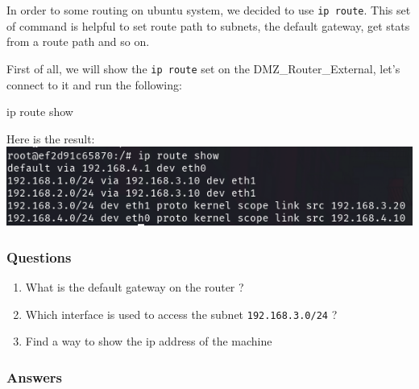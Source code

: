 \documentclass[a4paper,11pt,singlespacing]{article}
\newenvironment{Shaded}{}{}
\newcommand{\ExtensionTok}[1]{#1}
\newcommand{\NormalTok}[1]{#1}
\providecommand{\tightlist}{%
  \setlength{\itemsep}{0pt}\setlength{\parskip}{0pt}}
\begin{document}
In order to some routing on ubuntu system, we decided to use
\texttt{ip\ route}. This set of command is helpful to set route path to
subnets, the default gateway, get stats from a route path and so on.

First of all, we will show the \texttt{ip\ route} set on the
DMZ\_Router\_External, let's connect to it and run the following:

\begin{Shaded}
\begin{Highlighting}[]
\ExtensionTok{ip}\NormalTok{ route show}
\end{Highlighting}
\end{Shaded}

Here is the result:
\includegraphics{Images/Image04.png}

\subsubsection{Questions}\label{questions-1}

\begin{enumerate}
\def\labelenumi{\arabic{enumi}.}
\tightlist
\item
  What is the default gateway on the router ?
\item
  Which interface is used to access the subnet \texttt{192.168.3.0/24} ?
\item
  Find a way to show the ip address of the machine
\end{enumerate}

\newpage

\subsubsection{Answers}\label{answers-1}
\end{document}
